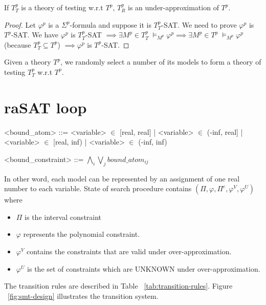 \begin{theorem}
If $T^p_T$ is a theory of testing w.r.t $T^p$, $T^p_R$ is an under-approximation of $T^p$.
\end{theorem}

\begin{proof}
Let $\varphi^p$ is a $\Sigma^p$-formula and suppose it is $T^p_T$-SAT. We need to prove $\varphi^p$ is $T^p$-SAT. We have $\varphi^p$ is $T^p_T$-SAT $\implies \exists M^p \in T^p_T \; \models_{M^p} \varphi^p \implies \exists M^p \in T^p \; \models_{M^p} \varphi^p$ (because $T^p_T \subseteq T^p$) $\implies \varphi^p$ is $T^p$-SAT.
\end{proof}

Given a theory $T^p$, we randomly select a number of its models to form a theory of testing $T^p_T$ w.r.t $T^p$.

\section{raSAT loop}
\begin{grammar}
<bound\_atom> ::= <variable> $\in$ [real, real] | <variable> $\in$ (-inf, real] | <variable> $\in$ [real, inf) | <variable> $\in$ (-inf, inf)


<bound\_constraint> ::= $\bigwedge\limits_i\bigvee\limits_jbound\_atom_{ij}$
\end{grammar}
In other word, each model can be represented by an assignment of one real number to each variable. 
State of search procedure contains  $(\Pi, \varphi, \Pi^c, \varphi^V, \varphi^U)$ where 
\begin{itemize}
\item $\Pi$ is the interval constraint
\item $\varphi$ represents the polynomial constraint.
\item $\varphi^V$ contains the constraints that are valid under over-approximation.
\item $\varphi^U$ is the set of constraints which are UNKNOWN under over-approximation.
\end{itemize}
The transition rules are described in Table ~\ref{tab:transition-rules}. Figure ~\ref{fig:smt-design} illustrates the transition system. 

